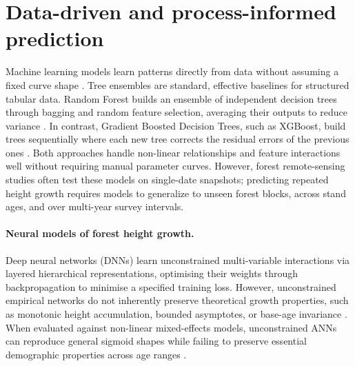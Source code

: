\section{Data-driven and process-informed prediction}
\label{sec:background-prediction}

Machine learning models learn patterns directly from data without assuming a fixed curve shape \citep{lee2018Machine_C3_LID}. Tree ensembles are standard, effective baselines for structured tabular data. Random Forest builds an ensemble of independent decision trees through bagging and random feature selection, averaging their outputs to reduce variance \citep{breiman2001RandomForest_C4_NN}. In contrast, Gradient Boosted Decision Trees, such as XGBoost, build trees sequentially where each new tree corrects the residual errors of the previous ones \citep{chen2016XGBoost_C4_NN}. Both approaches handle non-linear relationships and feature interactions well without requiring manual parameter curves. However, forest remote-sensing studies often test these models on single-date snapshots; predicting repeated height growth requires models to generalize to unseen forest blocks, across stand ages, and over multi-year survey intervals.

\paragraph*{Neural models of forest height growth.}
Deep neural networks (DNNs) learn unconstrained multi-variable interactions via layered hierarchical representations, optimising their weights through backpropagation to minimise a specified training loss. However, unconstrained empirical networks do not inherently preserve theoretical growth properties, such as monotonic height accumulation, bounded asymptotes, or base-age invariance \citep{ercanli2023Comparison_C4_NN,karatepe2022Total_C4_NN}. When evaluated against non-linear mixed-effects models, unconstrained ANNs can reproduce general sigmoid shapes while failing to preserve essential demographic properties across age ranges \citep{ercanli2023Comparison_C4_NN}.


